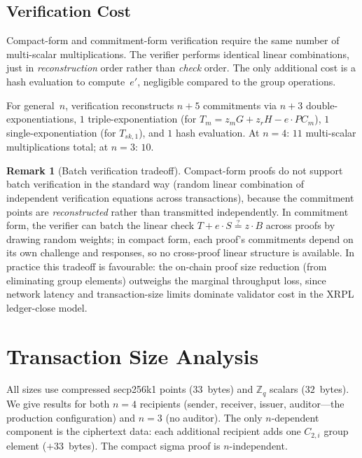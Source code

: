 \documentclass[11pt]{article}
\theoremstyle{definition}
\newtheorem{remark}[theorem]{Remark}
\newcommand{\Zq}{\mathbb{Z}_q}
\newcommand{\sk}{\mathit{sk}}
\begin{document}
\subsection{Verification Cost}
\label{sec:verification-cost}

Compact-form and commitment-form verification require the same number
of multi-scalar multiplications.
The verifier performs identical linear combinations, just in
\emph{reconstruction} order rather than \emph{check} order.
The only additional cost is a hash evaluation to compute~$e'$,
negligible compared to the group operations.

For general~$n$, verification reconstructs $n + 5$ commitments via
$n + 3$ double-exponentiations, $1$ triple-exponentiation (for
$T_m = z_m G + z_r H - e \cdot \mathit{PC}_m$),
$1$ single-exponentiation (for $T_{\sk,1}$), and $1$ hash evaluation.
At $n = 4$: $11$ multi-scalar multiplications total;
at $n = 3$: $10$.

\begin{remark}[Batch verification tradeoff]
  \label{rem:batch}
  Compact-form proofs do not support batch verification in the
  standard way (random linear combination of independent verification
  equations across transactions), because the commitment points are
  \emph{reconstructed} rather than transmitted independently.
  In commitment form, the verifier can batch the linear check
  $T + e \cdot S \stackrel{?}{=} z \cdot B$ across proofs by drawing
  random weights; in compact form, each proof's commitments depend on
  its own challenge and responses, so no cross-proof linear structure
  is available.
  In practice this tradeoff is favourable: the on-chain proof size
  reduction (from eliminating group elements) outweighs the marginal
  throughput loss, since network latency and transaction-size limits
  dominate validator cost in the XRPL ledger-close model.
\end{remark}

\section{Transaction Size Analysis}
\label{sec:sizes}

All sizes use compressed secp256k1 points ($33$~bytes) and $\Zq$
scalars ($32$~bytes).
We give results for both $n = 4$ recipients
(sender, receiver, issuer, auditor---the production configuration)
and $n = 3$ (no auditor).
The only $n$-dependent component is the ciphertext data:
each additional recipient adds one $C_{2,i}$ group element
($+33$~bytes).
The compact sigma proof is $n$-independent.
\end{document}
